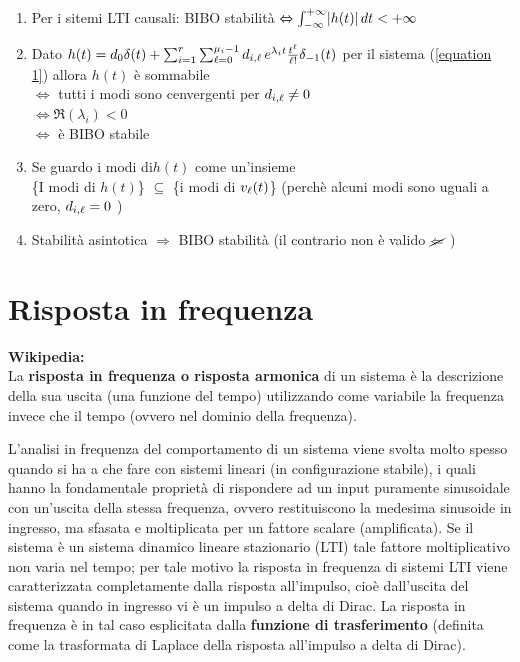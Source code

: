	\begin{osservazione}\leavevmode
		\begin{enumerate}
			\item Per i sitemi LTI causali: BIBO stabilità $\Leftrightarrow \int_{-\infty}^{+\infty}\lvert h(t) \rvert \, d t < +\infty$
			
			\item Dato $ h(t)= d_0 \delta(t) + \sum_{i=1}^{r}\sum_{\ell=0}^{\mu_i-1}d_{i,\ell} \,e^{\lambda_it}\frac{t^\ell}{\ell!}\delta_{-1} (t)  $ per il sistema (\ref{equation 1})
			allora $h(t) $ è sommabile \\
			$\Leftrightarrow$ tutti i modi sono cenvergenti per $d_{i,\ell}\ne0$\\
			$\Leftrightarrow \Re(\lambda_i)<0$\\
			$ \Leftrightarrow $ è BIBO stabile
			
			\item Se guardo i modi di$  h(t) $ come un'insieme\\
			\{I modi di $h(t)$\} $\subseteq$ \{i modi di $v_\ell(t)$\} (perchè alcuni modi sono uguali a zero, $d_{i,\ell}=0$ )
			
			\item  Stabilità asintotica $\Rightarrow$ BIBO stabilità (il contrario non è valido $\cancel{\Leftarrow}$ )
		\end{enumerate}
	\end{osservazione}


\section{Risposta in frequenza}
		
	\textbf{Wikipedia:}\\
	La \textbf{risposta in frequenza o risposta armonica} di un sistema è la descrizione della sua uscita 
	(una funzione del tempo) utilizzando come variabile la frequenza invece che il tempo 
	(ovvero nel dominio della frequenza).
	
	L'analisi in frequenza del comportamento di un sistema viene svolta molto spesso 
	quando si ha a che fare con sistemi lineari (in configurazione stabile), 
	i quali hanno la fondamentale proprietà di rispondere ad un input puramente sinusoidale 
	con un'uscita della stessa frequenza, ovvero restituiscono la medesima sinusoide in ingresso, 
	ma sfasata e moltiplicata per un fattore scalare (amplificata). 
	Se il sistema è un sistema dinamico lineare stazionario (LTI) tale fattore moltiplicativo non varia 
	nel tempo; 
	per tale motivo la risposta in frequenza di sistemi LTI viene caratterizzata completamente 
	dalla risposta all'impulso, cioè dall'uscita del sistema quando in ingresso vi è un impulso
	a delta di Dirac. 
	La risposta in frequenza è in tal caso esplicitata dalla \textbf{funzione di trasferimento} 
	(definita come la trasformata di Laplace della risposta all'impulso a delta di Dirac).

